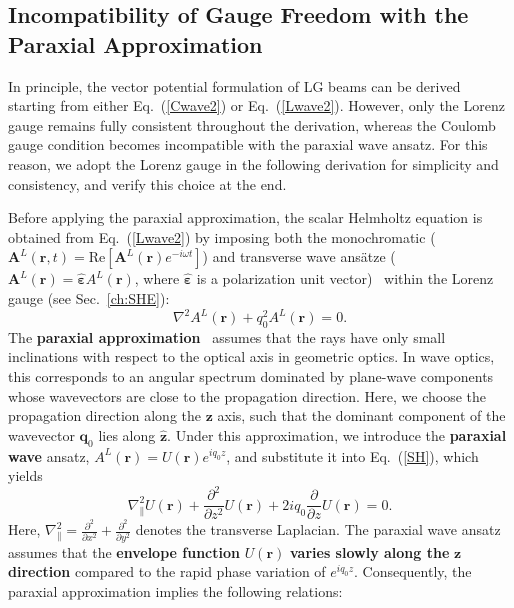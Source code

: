 \subsection{Incompatibility of Gauge Freedom with the Paraxial Approximation}

In principle, the vector potential formulation of LG beams can be derived starting from either Eq.~(\ref{Cwave2}) or Eq.~(\ref{Lwave2}). However, only the Lorenz gauge remains fully consistent throughout the derivation, whereas the Coulomb gauge condition becomes incompatible with the paraxial wave ansatz.  For this reason, we adopt the Lorenz gauge in the following derivation for simplicity and consistency, and verify this choice at the end.

Before applying the paraxial approximation, the scalar Helmholtz equation is obtained from Eq.~(\ref{Lwave2}) by imposing both the monochromatic ($\boldsymbol{A}^L(\boldsymbol{r}, t)=\text{Re}\left[\boldsymbol{A}^L(\boldsymbol{r}) e^{-i\omega t}\right]$) and transverse wave ans\"atze ($\boldsymbol{A}^L(\boldsymbol{r})=\hat{\boldsymbol{\varepsilon}}A^L(\boldsymbol{r})$, where $\hat{\boldsymbol{\varepsilon}}$ is a polarization unit vector)~\cite{griffiths2017introduction} within the Lorenz gauge (see Sec.~\ref{ch:SHE}):
\begin{equation}
\nabla^2 A^L(\boldsymbol{r}) + q_0^2 A^L(\boldsymbol{r}) = 0.
\label{SH}
\end{equation}
The \textbf{paraxial approximation}~\cite{andrews2012angular, kasap2013optoelectronics, pedrotti2007introduction} assumes that the rays have only small inclinations with respect to the optical axis in geometric optics. In wave optics, this corresponds to an angular spectrum dominated by plane-wave components whose wavevectors are close to the propagation direction. Here, we choose the propagation direction along the $\boldsymbol{z}$ axis, such that the dominant component of the wavevector $\boldsymbol{q}_0$ lies along $\hat{\boldsymbol{z}}$.
Under this approximation, we introduce the \textbf{paraxial wave} ansatz, $A^L(\boldsymbol{r}) = U(\boldsymbol{r}) e^{iq_0 z}$, and substitute it into Eq.~(\ref{SH}), which yields 
\begin{equation}
\nabla^2_\parallel U(\boldsymbol{r})
+ \frac{\partial^2}{\partial z^2} U(\boldsymbol{r})
+ 2 i q_0 \frac{\partial}{\partial z} U(\boldsymbol{r}) = 0.
\end{equation}
Here, $\nabla^2_\parallel = \frac{\partial^2}{\partial x^2} + \frac{\partial^2}{\partial y^2}$ denotes the transverse Laplacian. The paraxial wave ansatz assumes that the \textbf{envelope function} $U(\boldsymbol{r})$ \textbf{varies slowly along the} $\boldsymbol{z}$ \textbf{direction} compared to the rapid phase variation of $e^{i q_0 z}$. Consequently, the paraxial approximation implies the following relations:
